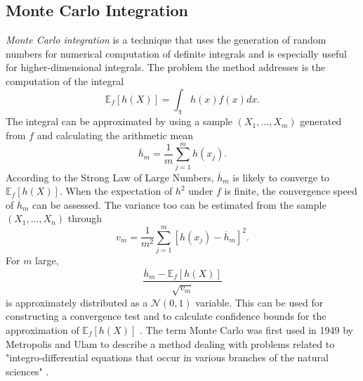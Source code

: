 \subsection{Monte Carlo Integration}
\textit{Monte Carlo integration} is a technique that uses the generation of random numbers for numerical computation of definite integrals and is especially useful for higher-dimensional integrals. The problem the method addresses is the computation of the integral
\begin{equation}
    \mathbb{E}_f\left[h\left(X\right)\right]=\int_\chi h(x)f(x)dx.
\end{equation}
The integral can be approximated by using a sample $\left(X_1,...,X_m\right)$ generated from $f$ and calculating the arithmetic mean
\begin{equation}
    \overline{h}_m=\frac{1}{m}\sum_{j=1}^mh\left(x_j\right).
\end{equation}
According to the Strong Law of Large Numbers, $\overline{h}_m$ is likely to converge to $\mathbb{E}_f\left[h\left(X\right)\right]$. When the expectation of $h^2$ under $f$ is finite, the convergence speed of $\overline{h}_m$ can be assessed. The variance too can be estimated from the sample $\left(X_1,...,X_n\right)$ through
\begin{equation}
    v_m=\frac{1}{m^2}\sum_{j=1}^m\left[h\left(x_j\right)-\overline{h}_m\right]^2.
\end{equation}
For $m$ large,
\begin{equation}
    \frac{\overline{h}_m-\mathbb{E}_f\left[h\left(X\right)\right]}{\sqrt{v_m}}
\end{equation}
is approximately distributed as a $\mathcal{N}(0,1)$ variable. This can be used for constructing a convergence test and to calculate confidence bounds for the approximation of $\mathbb{E}_f\left[h\left(X\right)\right]$ \autocite[][83--84]{robert2013monte}. The term Monte Carlo was first used in 1949 by Metropolis and Ulam to describe a method dealing with problems related to "integro-differential equations that occur in various branches of the natural sciences" \autocite[][]{metropolis1949monte}.
